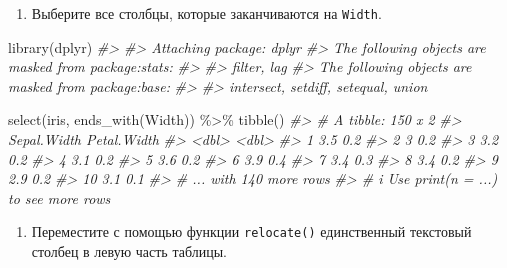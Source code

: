 \documentclass[
]{book}
\newenvironment{Shaded}{\begin{snugshade}}{\end{snugshade}}
\newcommand{\CommentTok}[1]{\textcolor[rgb]{0.56,0.35,0.01}{\textit{#1}}}
\newcommand{\FunctionTok}[1]{\textcolor[rgb]{0.00,0.00,0.00}{#1}}
\newcommand{\NormalTok}[1]{#1}
\newcommand{\SpecialCharTok}[1]{\textcolor[rgb]{0.00,0.00,0.00}{#1}}
\newcommand{\StringTok}[1]{\textcolor[rgb]{0.31,0.60,0.02}{#1}}
\providecommand{\tightlist}{%
  \setlength{\itemsep}{0pt}\setlength{\parskip}{0pt}}
\begin{document}
\begin{enumerate}
\def\labelenumi{\arabic{enumi}.}
\tightlist
\item
  Выберите все столбцы, которые заканчиваются на \texttt{Width}.
\end{enumerate}

\begin{Shaded}
\begin{Highlighting}[]
\FunctionTok{library}\NormalTok{(dplyr)}
\CommentTok{\#\textgreater{} }
\CommentTok{\#\textgreater{} Attaching package: \textquotesingle{}dplyr\textquotesingle{}}
\CommentTok{\#\textgreater{} The following objects are masked from \textquotesingle{}package:stats\textquotesingle{}:}
\CommentTok{\#\textgreater{} }
\CommentTok{\#\textgreater{}     filter, lag}
\CommentTok{\#\textgreater{} The following objects are masked from \textquotesingle{}package:base\textquotesingle{}:}
\CommentTok{\#\textgreater{} }
\CommentTok{\#\textgreater{}     intersect, setdiff, setequal, union}

\FunctionTok{select}\NormalTok{(iris, }\FunctionTok{ends\_with}\NormalTok{(}\StringTok{\textquotesingle{}Width\textquotesingle{}}\NormalTok{)) }\SpecialCharTok{\%\textgreater{}\%} 
  \FunctionTok{tibble}\NormalTok{()}
\CommentTok{\#\textgreater{} \# A tibble: 150 x 2}
\CommentTok{\#\textgreater{}    Sepal.Width Petal.Width}
\CommentTok{\#\textgreater{}          \textless{}dbl\textgreater{}       \textless{}dbl\textgreater{}}
\CommentTok{\#\textgreater{}  1         3.5         0.2}
\CommentTok{\#\textgreater{}  2         3           0.2}
\CommentTok{\#\textgreater{}  3         3.2         0.2}
\CommentTok{\#\textgreater{}  4         3.1         0.2}
\CommentTok{\#\textgreater{}  5         3.6         0.2}
\CommentTok{\#\textgreater{}  6         3.9         0.4}
\CommentTok{\#\textgreater{}  7         3.4         0.3}
\CommentTok{\#\textgreater{}  8         3.4         0.2}
\CommentTok{\#\textgreater{}  9         2.9         0.2}
\CommentTok{\#\textgreater{} 10         3.1         0.1}
\CommentTok{\#\textgreater{} \# ... with 140 more rows}
\CommentTok{\#\textgreater{} \# i Use \textasciigrave{}print(n = ...)\textasciigrave{} to see more rows}
\end{Highlighting}
\end{Shaded}

\begin{enumerate}
\def\labelenumi{\arabic{enumi}.}
\setcounter{enumi}{1}
\tightlist
\item
  Переместите с помощью функции \texttt{relocate()} единственный текстовый столбец в левую часть таблицы.
\end{enumerate}
\end{document}
